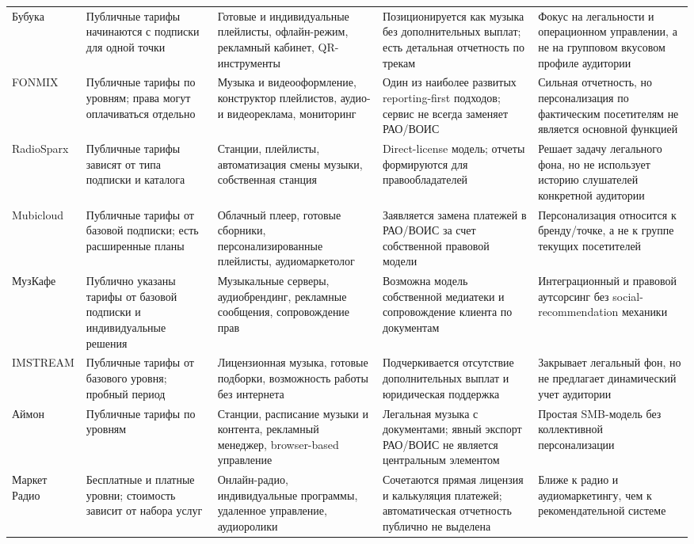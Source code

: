\begin{longtable}{p{}p{}p{}p{}p{}}
\addlinespace
Бубука & Публичные тарифы начинаются с подписки для одной точки & Готовые и индивидуальные плейлисты, офлайн-режим, рекламный кабинет, QR-инструменты & Позиционируется как музыка без дополнительных выплат; есть детальная отчетность по трекам & Фокус на легальности и операционном управлении, а не на групповом вкусовом профиле аудитории \\
\addlinespace
FONMIX & Публичные тарифы по уровням; права могут оплачиваться отдельно & Музыка и видеооформление, конструктор плейлистов, аудио- и видеореклама, мониторинг & Один из наиболее развитых reporting-first подходов; сервис не всегда заменяет РАО/ВОИС & Сильная отчетность, но персонализация по фактическим посетителям не является основной функцией \\
\addlinespace
RadioSparx & Публичные тарифы зависят от типа подписки и каталога & Станции, плейлисты, автоматизация смены музыки, собственная станция & Direct-license модель; отчеты формируются для правообладателей & Решает задачу легального фона, но не использует историю слушателей конкретной аудитории \\
\addlinespace
Mubicloud & Публичные тарифы от базовой подписки; есть расширенные планы & Облачный плеер, готовые сборники, персонализированные плейлисты, аудиомаркетолог & Заявляется замена платежей в РАО/ВОИС за счет собственной правовой модели & Персонализация относится к бренду/точке, а не к группе текущих посетителей \\
\addlinespace
МузКафе & Публично указаны тарифы от базовой подписки и индивидуальные решения & Музыкальные серверы, аудиобрендинг, рекламные сообщения, сопровождение прав & Возможна модель собственной медиатеки и сопровождение клиента по документам & Интеграционный и правовой аутсорсинг без social-recommendation механики \\
\addlinespace
IMSTREAM & Публичные тарифы от базового уровня; пробный период & Лицензионная музыка, готовые подборки, возможность работы без интернета & Подчеркивается отсутствие дополнительных выплат и юридическая поддержка & Закрывает легальный фон, но не предлагает динамический учет аудитории \\
\addlinespace
Аймон & Публичные тарифы по уровням & Станции, расписание музыки и контента, рекламный менеджер, browser-based управление & Легальная музыка с документами; явный экспорт РАО/ВОИС не является центральным элементом & Простая SMB-модель без коллективной персонализации \\
\addlinespace
Маркет Радио & Бесплатные и платные уровни; стоимость зависит от набора услуг & Онлайн-радио, индивидуальные программы, удаленное управление, аудиоролики & Сочетаются прямая лицензия и калькуляция платежей; автоматическая отчетность публично не выделена & Ближе к радио и аудиомаркетингу, чем к рекомендательной системе \\
\bottomrule
\end{longtable}
\endgroup

